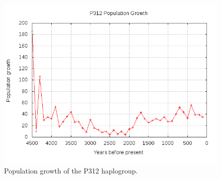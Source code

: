 \begin{figure}[ht]
\centering
\includegraphics[width=13cm]{img/P312.png}
\caption{Population growth of the P312 haplogroup.}
\end{figure}






